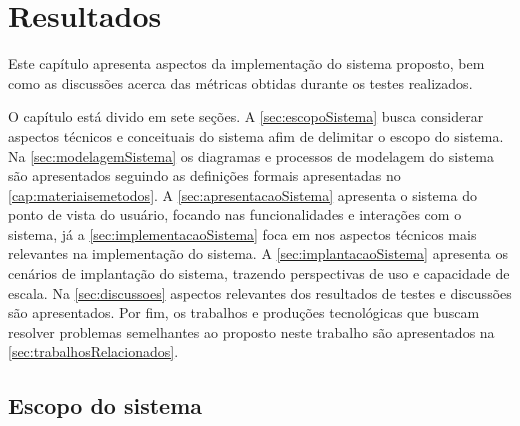 
\chapter{Resultados}
\label{cap:resultados}

Este capítulo apresenta aspectos da implementação do sistema proposto, bem como as discussões acerca
das métricas obtidas durante os testes realizados.

O capítulo está divido em sete seções.
A \autoref{sec:escopoSistema} busca considerar aspectos técnicos e conceituais do sistema afim de delimitar o escopo do sistema.
Na \autoref{sec:modelagemSistema} os diagramas e processos de modelagem do sistema são apresentados
seguindo as definições formais apresentadas no \autoref{cap:materiaisemetodos}.
A \autoref{sec:apresentacaoSistema} apresenta o sistema do ponto de vista do usuário, focando nas funcionalidades e interações com o sistema,
já a \autoref{sec:implementacaoSistema} foca em nos aspectos técnicos mais relevantes na implementação do sistema.
A \autoref{sec:implantacaoSistema} apresenta os cenários de implantação do sistema, trazendo perspectivas de uso e capacidade de escala.
Na \autoref{sec:discussoes} aspectos relevantes dos resultados de testes e discussões são apresentados.
Por fim, os trabalhos e produções tecnológicas que buscam resolver problemas semelhantes ao proposto neste trabalho são apresentados na \autoref{sec:trabalhosRelacionados}.



\section{Escopo do sistema}
\label{sec:escopoSistema}

